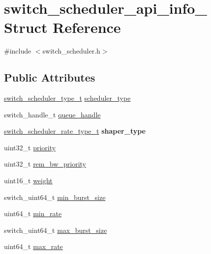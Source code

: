 \hypertarget{structswitch__scheduler__api__info__}{\section{switch\+\_\+scheduler\+\_\+api\+\_\+info\+\_\+ Struct Reference}
\label{structswitch__scheduler__api__info__}
}


{\ttfamily \#include $<$switch\+\_\+scheduler.\+h$>$}

\subsection*{Public Attributes}
\begin{DoxyCompactItemize}
\item 
\hyperlink{group__Scheduler_ga62f91884031e17accd1bfa6d07bcddd5}{switch\+\_\+scheduler\+\_\+type\+\_\+t} \hyperlink{structswitch__scheduler__api__info___a324b02644e4e542c1fec4a539296cfb0}{scheduler\+\_\+type}
\item 
switch\+\_\+handle\+\_\+t \hyperlink{structswitch__scheduler__api__info___a39c03f1d9101f9f365624ed294ff6298}{queue\+\_\+handle}
\item 
\hypertarget{structswitch__scheduler__api__info___a9fc18e882dafa4cfe9e43fdb9053bb04}{\hyperlink{group__Scheduler_gafaa6b883d003bac33a4e76086ae90e3b}{switch\+\_\+scheduler\+\_\+rate\+\_\+type\+\_\+t} {\bfseries shaper\+\_\+type}}\label{structswitch__scheduler__api__info___a9fc18e882dafa4cfe9e43fdb9053bb04}

\item 
uint32\+\_\+t \hyperlink{structswitch__scheduler__api__info___a00be453b7f125827b4cdd214758ed3b8}{priority}
\item 
uint32\+\_\+t \hyperlink{structswitch__scheduler__api__info___af67753b2b5a967a2622509d6173e8583}{rem\+\_\+bw\+\_\+priority}
\item 
uint16\+\_\+t \hyperlink{structswitch__scheduler__api__info___a5fbeb37e26b1365f943cce012758cf00}{weight}
\item 
switch\+\_\+uint64\+\_\+t \hyperlink{structswitch__scheduler__api__info___a4b941fa3f027b64a80023e2a793c2099}{min\+\_\+burst\+\_\+size}
\item 
uint64\+\_\+t \hyperlink{structswitch__scheduler__api__info___a8a1df3a5a53915ae7f5399badc2a4173}{min\+\_\+rate}
\item 
switch\+\_\+uint64\+\_\+t \hyperlink{structswitch__scheduler__api__info___a21ff5ba4e054aa95741df42277cb5625}{max\+\_\+burst\+\_\+size}
\item 
uint64\+\_\+t \hyperlink{structswitch__scheduler__api__info___a9e2c38f94350f794aad12da23c48ae55}{max\+\_\+rate}
\end{DoxyCompactItemize}


